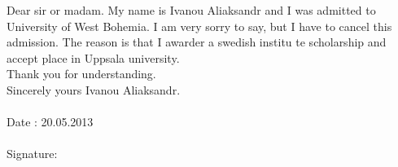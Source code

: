 \documentclass[pdftex,a4paper,14pt,english,russian]{extarticle}
\begin{document}
	Dear sir or madam. My name is Ivanou Aliaksandr and I was admitted to University of West Bohemia. I am very sorry to say, but I have to cancel this admission. The reason is that I awarder a swedish institu
	te scholarship and accept place in Uppsala university.
\\[3ex]
	Thank you for understanding.
\\[3ex]
	Sincerely yours Ivanou Aliaksandr.
\\[3ex]

\\[3ex]

Date : 20.05.2013
\\[3ex]
\\[3ex]

Signature: 
\end{document}
